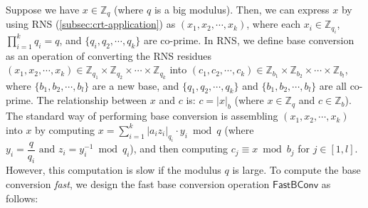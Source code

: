 $ $


Suppose we have $x \in \mathbb{Z}_q$ (where $q$ is a big modulus). Then, we can express $x$ by using RNS (\autoref{subsec:crt-application}) as $(x_1, x_2, \cdots, x_k)$, where each $x_i \in \mathbb{Z}_{q_i}$, $\prod\limits_{i=1}^k q_i = q$, and $\{q_i, q_2, \cdots, q_k\}$ are co-prime. In RNS, we define base conversion as an operation of converting the RNS residues $(x_1, x_2, \cdots, x_k) \in \mathbb{Z}_{q_1} \times \mathbb{Z}_{q_2} \times \cdots \times 
 \mathbb{Z}_{q_k}$ into $(c_1, c_2, \cdots, c_k) \in \mathbb{Z}_{b_1} \times \mathbb{Z}_{b_2} \times \cdots \times \mathbb{Z}_{b_l}$, where $\{b_1, b_2, \cdots, b_l\}$ are a new base, and $\{q_1, q_2, \cdots, q_k\}$ and $\{b_1, b_2, \cdots, b_l\}$ are all co-prime. The relationship between $x$ and $c$ is: $c = |x|_b$ (where $x \in \mathbb{Z}_{q}$ and $c \in \mathbb{Z}_b$). The standard way of performing base conversion is assembling $(x_1, x_2, \cdots, x_k)$ into $x$ by computing $x = \sum\limits_{i=1}^k |a_i z_i|_{q_i} \cdot y_i \bmod q$ (where $y_i = \dfrac{q}{q_i} \text{ and } z_i = y_i^{-1} \bmod q_i$), and then computing $c_j \equiv x \bmod b_j$ for $j \in [1, l]$. However, this computation is slow if the modulus $q$ is large. To compute the base conversion \textit{fast}, we design the fast base conversion operation $\textsf{FastBConv}$ as follows: 


